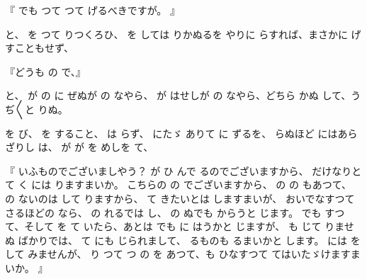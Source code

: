 『
でも
つて
つて
げるべきですが。
』

と、
を
つて
りつくろひ、
を
しては
りかぬるを
やりに
らすれば、まさかに
げ
すこともせず、

『どうも
の
で、』

と、
が
の
に
ぜぬが
の
なやら、
が
はせしが
の
なやら、どちら
かぬ
して、うぢ〳〵と
りぬ。

を
び、
を
すること、
は
らず、
にたゞ
ありて
に
ずるを、
らぬほど
にはあらざりし
は、
が
が
を
めしを
て、

『
いふものでございましやう？
が
ひ
んで
るのでございますから、
だけなりと
て
く
には
りますまいか。
こちらの
の
でございますから、
の
の
もあつて、
の
ないのは
して
りますから、
て
きたいとは
しますまいが、
おいでなすつて
さるほどの
なら、
の
れるでは
し、
の
ぬでも
からうと
じます。
でも
すつて、そして
を
て
いたら、あとは
でも
に
はうかと
じますが、
も
じて
りませぬ
ばかりでは、
て
にも
じられまして、
るものも
るまいかと
します。
には
を
して
みませんが、
り
つて
つ
の
を
あつて、も
ひなすつて
てはいたゞけますまいか。
』

